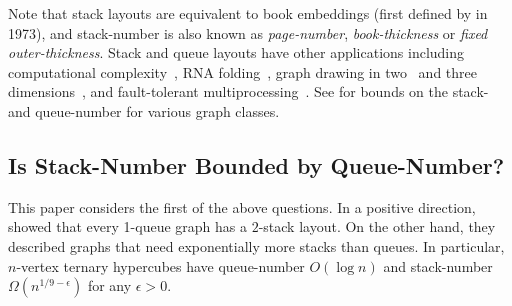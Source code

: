 \documentclass[kpfonts]{patmorin}
\begin{document}
Note that stack layouts are equivalent to book embeddings (first defined by \citet{Ollmann73} in 1973), and stack-number is also known as \emph{page-number}, \emph{book-thickness} or \emph{fixed outer-thickness}. Stack and queue layouts have other applications including computational complexity~\citep{GKS89,DSW16,Bourgain09,BY13},  RNA folding~\citep{HS99}, graph drawing in two~\citep{BB04,ADFPR12,SSSV-WG94} and three dimensions~\citep{DMW05,Wood-GD01,DMW17,DPW04},
and fault-tolerant multiprocessing~\citep{CLR87,Rosenberg83a,Rosenberg86a,Rosenberg86}.
See \citep{BK79,Blankenship-PhD03,DujWoo04,DujWoo-DCG07,DJMMUW20,DFP13,BFGMMRU19,Yannakakis89,Yann20,MBKPRU20} for bounds on the stack- and queue-number for various graph classes.

\subsection*{Is Stack-Number Bounded by Queue-Number?}

This paper considers the first of the above questions. In a positive direction, \citet{HLR92}  showed that every 1-queue graph has a $2$-stack layout. On the other hand, they described graphs that need exponentially more stacks than queues. In particular, $n$-vertex ternary hypercubes have queue-number $O(\log n)$ and stack-number $\Omega(n^{1/9-\epsilon})$ for any $\epsilon>0$.


\end{document}
